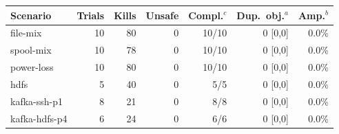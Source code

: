 
\begin{tabular}{@{}lrrrrrr@{}}
\toprule
Scenario & Trials & Kills & Unsafe & Compl.$^c$ & Dup.\ obj.$^a$ & Amp.$^b$ \\
\midrule
file-mix & 10 & 80 & 0 & 10/10 & 0 [0,0] & 0.0\% \\
spool-mix & 10 & 78 & 0 & 10/10 & 0 [0,0] & 0.0\% \\
power-loss & 10 & 80 & 0 & 10/10 & 0 [0,0] & 0.0\% \\
hdfs & 5 & 40 & 0 & 5/5 & 0 [0,0] & 0.0\% \\
kafka-ssh-p1 & 8 & 21 & 0 & 8/8 & 0 [0,0] & 0.0\% \\
kafka-hdfs-p4 & 6 & 24 & 0 & 6/6 & 0 [0,0] & 0.0\% \\
\bottomrule
\end{tabular}
